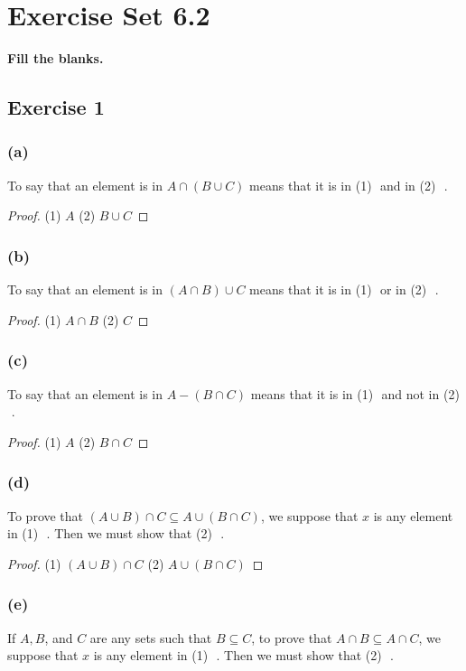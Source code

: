 \documentclass[14pt]{extarticle}
\newcommand{\fbl}{\underline{\hspace{1cm}}\,\,}
\newcommand{\cy}{\color{cyan}}
\begin{document}
\section{Exercise Set 6.2}
{\bf \cy Fill the blanks.}

\subsection{Exercise 1}
\subsubsection{(a)}
To say that an element is in \(A \cap (B \cup C)\) means that it is in (1) \fbl and in (2) \fbl.

\begin{proof}
(1) $A$ (2) \(B \cup C\)

\end{proof}

\subsubsection{(b)}
To say that an element is in \((A \cap B) \cup C\) means that it is in (1) \fbl or in (2) \fbl.

\begin{proof}
(1) \(A \cap B\) (2) $C$
\end{proof}

\subsubsection{(c)}
To say that an element is in \(A - (B \cap C)\) means that it is in (1) \fbl and not in (2) \fbl.

\begin{proof}
(1) $A$ (2) \(B \cap C\)
\end{proof}

\subsubsection{(d)}
To prove that \((A \cup B) \cap C \subseteq A \cup (B \cap C)\), we suppose that $x$ is any element in (1) \fbl. 
Then we must show that (2) \fbl.

\begin{proof}
(1) \((A \cup B) \cap C\) (2) \(A \cup (B \cap C)\)
\end{proof}

\subsubsection{(e)}
If $A, B$, and $C$ are any sets such that \(B \subseteq C\), to prove that \(A \cap B \subseteq A \cap C\), we 
suppose that $x$ is any element in (1) \fbl. Then we must show that (2) \fbl.
\end{document}
